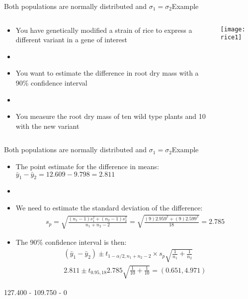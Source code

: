 \documentclass[xcolor=dvipsnames]{beamer}
\begin{document}
\begin{frame}{Both populations are normally distributed and $\sigma_1 = \sigma_2$}{Example}
\begin{columns}
	\begin{column}{.5 \textwidth}
		\begin{itemize}
			\item You have genetically modified a strain of rice to express a different variant in a gene of interest 
			\item[]
			\item You want to estimate the difference in root dry mass with a 90\% confidence interval
			\item[]
			\item You measure the root dry mass of ten wild type plants and 10 with the new variant
		\end{itemize}
	\end{column}
	\begin{column}{.5 \textwidth}
		\begin{center}
			\texttt{[image: rice1]}
		\end{center}
	\end{column}
\end{columns}
\end{frame}

\begin{frame}{Both populations are normally distributed and $\sigma_1 = \sigma_2$}{Example}
\begin{itemize}
	\item The point estimate for the difference in means: $\bar{y}_1-\bar{y}_2 = 12.609-9.798 = 2.811$
	\item[]
	\item We need to estimate the standard deviation of the difference:
	\begin{align*}
	s_p = \sqrt{\frac{(n_1 -1)s_1^2 + (n_2-1)s_2^2}{n_1 + n_2 -2}} = \sqrt{\frac{(9)2.959^2 + (9)2.599^2}{18}} = 2.785
	\end{align*}
	\item The 90\% confidence interval is then: 
	\begin{align*}
	(\bar{y}_1 - \bar{y}_2) \pm t_{1-\alpha /2, n_1 + n_2 - 2} \times s_p \sqrt{\frac{1}{n_1} + \frac{1}{n_2}}\\
		2.811 \pm t_{0.95, 18} 2.785 \sqrt{\frac{1}{10} + \frac{1}{10}} = (0.651, 4.971)
	\end{align*}
\end{itemize}127.400 - 109.750 - 0
\end{frame}
\end{document}
